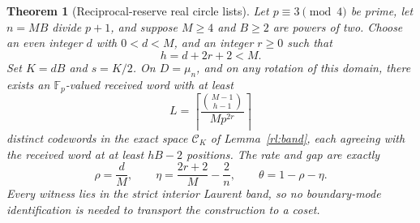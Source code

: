 \documentclass[11pt,letterpaper]{article}
\newtheorem{theorem}{Theorem}[section]
\theoremstyle{definition}
\theoremstyle{remark}
\begin{document}
\begin{theorem}[Reciprocal-reserve real circle lists]\label{rl:list}
Let $p\equiv3\pmod4$ be prime, let $n=MB$ divide $p+1$, and suppose $M\ge4$
and $B\ge2$ are powers of two. Choose an even integer $d$ with $0<d<M$,
and an integer $r\ge0$ such that
\[
 h=d+2r+2<M.
\]
Set $K=dB$ and $s=K/2$. On $D=\mu_n$, and on any
rotation of this domain, there exists an $\mathbb F_p$-valued received word
with at least
\[
 L=\left\lceil\frac{\binom{M-1}{h-1}}{M p^{2r}}\right\rceil
\]
distinct codewords in the exact space $\mathcal C_K$ of Lemma~\ref{rl:band},
each agreeing with the received word at at least $hB-2$ positions. The rate and
gap are exactly
\[
 \rho=\frac dM,\qquad
 \eta=\frac{2r+2}{M}-\frac2n,\qquad
 \theta=1-\rho-\eta.
\]
Every witness lies in the strict interior Laurent band, so no boundary-mode
identification is needed to transport the construction to a coset.
\end{theorem}
\end{document}

